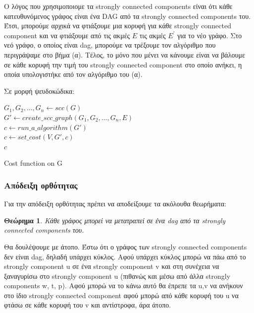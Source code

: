 \documentclass[a4paper,oneside, 11pt]{article}
\newtheorem{theorem}{Θεώρημα}
\begin{document}
Ο λόγος που χρησιμοποιομε τα strongly connected components είναι ότι κάθε κατευθυνόμενος γράφος είναι ένα DAG από τα strongly connected components του. Έτσι, μπορούμε αρχικά να φτιάξουμε μια κορυφή για κάθε  strongly connected component και να φτιάξουμε από τις ακμές $E$ τις ακμές $E^{'}$ για το νέο γράφο. Στο νεό γράφο, ο οποίος είναι dag, μπορούμε να τρέξουμε τον αλγόριθμο που περιγράψαμε στο βήμα (α). Τέλος, το μόνο που μένει να κάνουμε είναι να βάλουμε σε κάθε κορυφή την τιμή του strongly connected component στο οποίο ανήκει, η οποία υπολογιστήκε από τον αλγόριθμο του (α).

Σε μορφή ψευδοκώδικα: \bigbreak 
{\centering
\begin{minipage}{.7\linewidth}
\begin{algorithm}[H]
	$G_1, G_2, ..., G_n \gets scc(G)$ \\ 
	$G' \gets create\_scc\_graph(G_1, G_2, ..., G_n, E)$ \\
	$c \gets run\_a\_algorithm(G')$ \\
	$c \gets set\_cost(V, G', c)$ \\
	\Return $c$
	\bigbreak
	\caption{{Cost function on G}}
\end{algorithm}
\end{minipage}
\par
}


\subsubsection{Απόδειξη ορθότητας}

Για την απόδειξη ορθότητας πρέπει να αποδείξουμε τα ακόλουθα θεωρήματα:
\begin{theorem}
Κάθε γράφος μπορεί να μετατραπεί σε ένα dag από τα strongly connected components του.
\end{theorem}

Θα δουλέψουμε με άτοπο. Έστω ότι ο γράφος των strongly connected components δεν είναι dag, δηλαδή υπάρχει κύκλος. Αφού υπάρχει κύκλος μπορώ να πάω από το strongly component u σε ένα strongly component v και στη συνέχεια να ξαναγυρίσω στο strongly component u (πιθανώς και μέσω από άλλα strongly components w, t, p). Αφού μπορώ να το κάνω αυτό θα έπρεπε τα u,v να ανήκουν στο ίδιο strongly connected component αφού μπορώ από κάθε κορυφή του u να φτάσω σε κάθε κορυφή του v και αντίστροφα, άρα άτοπο. \bigbreak 
\end{document}
